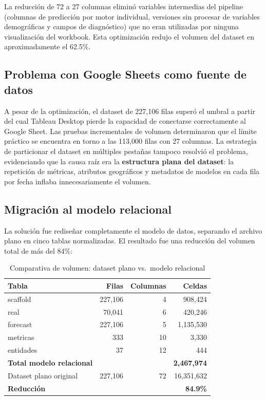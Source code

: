 \documentclass[12pt, letterpaper]{article}
\begin{document}
La reducción de 72 a 27 columnas eliminó variables intermedias del pipeline (columnas de predicción por motor individual, versiones sin procesar de variables demográficas y campos de diagnóstico) que no eran utilizadas por ninguna visualización del workbook. Esta optimización redujo el volumen del dataset en aproximadamente el 62.5\%.

\subsection{Problema con Google Sheets como fuente de datos}

A pesar de la optimización, el dataset de 227,106 filas superó el umbral a partir del cual Tableau Desktop pierde la capacidad de conectarse correctamente al Google Sheet. Las pruebas incrementales de volumen determinaron que el límite práctico se encuentra en torno a las 113,000 filas con 27 columnas. La estrategia de particionar el dataset en múltiples pestañas tampoco resolvió el problema, evidenciando que la causa raíz era la \textbf{estructura plana del dataset}: la repetición de métricas, atributos geográficos y metadatos de modelos en cada fila por fecha inflaba innecesariamente el volumen.

\subsection{Migración al modelo relacional}

La solución fue rediseñar completamente el modelo de datos, separando el archivo plano en cinco tablas normalizadas. El resultado fue una reducción del volumen total de más del 84\%:

\begin{table}[H]
\centering
\caption{Comparativa de volumen: dataset plano vs.\ modelo relacional}
\label{tab:comparativa_dataset}
\small
\begin{tabularx}{\textwidth}{X r r r}
\toprule
\textbf{Tabla} & \textbf{Filas} & \textbf{Columnas} & \textbf{Celdas} \\
\midrule
scaffold   & 227,106 & 4  & 908,424 \\
real       & 70,041  & 6  & 420,246 \\
forecast   & 227,106 & 5  & 1,135,530 \\
metricas   & 333     & 10 & 3,330 \\
entidades  & 37      & 12 & 444 \\
\midrule
\textbf{Total modelo relacional} & & & \textbf{2,467,974} \\
\midrule
Dataset plano original & 227,106 & 72 & 16,351,632 \\
\textbf{Reducción} & & & \textbf{84.9\%} \\
\bottomrule
\end{tabularx}
\end{table}
\end{document}
